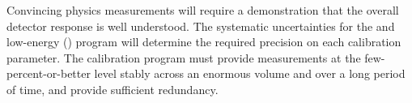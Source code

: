 
Convincing physics measurements will require a demonstration that the overall detector response is well understood. The systematic uncertainties for the  and low-energy () program will determine the required precision on each calibration parameter. 
The calibration program must provide measurements at the few-percent-or-better level stably across an enormous volume and over a long period of time, and provide sufficient redundancy. 

